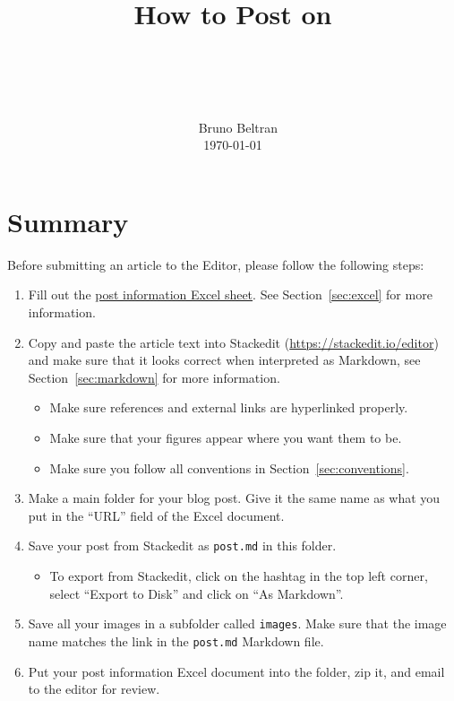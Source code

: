 \documentclass[paper=a4, fontsize=11pt]{scrartcl}
\title{\
        \usefont{OT1}{bch}{b}{n}
        \horrule{0.5pt} \\[0.4cm]
        \huge How to Post on \\ \dishurl{} \\
        \horrule{2pt} \\[0.5cm]
}
\author{\
        \normalfont{}                     \normalsize
        Bruno Beltran\\[-3pt]             \normalsize
        \today
}
\date{}
\numberwithin{equation}{section}        %
\numberwithin{figure}{section}            %
\numberwithin{table}{section}                %
\newcommand{\dishurlplain}[1]{http://thedishonscience.stanford.edu/#1}
\begin{document}
\maketitle

\section{Summary}
Before submitting an article to the Editor, please follow the following steps:
\begin{enumerate}
    \item Fill out the
        \href{\dishurlplain{documents/post\_info.xlsx}}{post information
            Excel sheet}. See Section~\ref{sec:excel} for more information.
    \item Copy and paste the article text into Stackedit
    (\url{https://stackedit.io/editor}) and make sure that it looks
    correct when interpreted as Markdown, see Section~\ref{sec:markdown} for more
    information.
        \begin{itemize}
            \item Make sure references and external links are hyperlinked
                properly.
            \item Make sure that your figures appear where you want them to be.
            \item Make sure you follow all conventions in
                Section~\ref{sec:conventions}.
        \end{itemize}
    \item Make a main folder for your blog post. Give it the same name as what
        you put in the ``URL'' field of the Excel document.

    \item Save your post from Stackedit as \texttt{post.md} in this folder.
        \begin{itemize}
            \item To export from Stackedit, click on the hashtag in the top left
                corner, select ``Export to Disk'' and click on ``As Markdown''.
        \end{itemize}
    \item Save all your images in a subfolder called \texttt{images}. Make sure
        that the image name matches the link in the \texttt{post.md} Markdown
        file.
    \item Put your post information Excel document into the folder, zip it, and
        email to the editor for review.
\end{enumerate}
\end{document}
